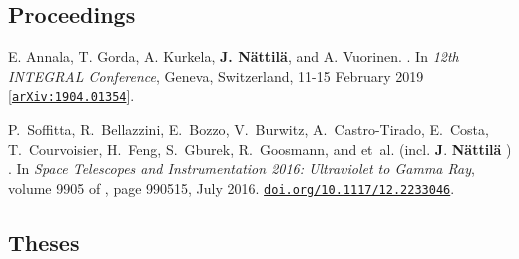 \documentclass[10pt]{article}
\begin{document}
\subsection*{\phantom{sub} Proceedings}
\vspace{-20pt}
\begin{thebibliography}{1}
\vspace{-5pt}

E. {Annala}, T. {Gorda}, A. {Kurkela}, \textbf{J. {N{\"a}ttil{\"a}}}, and A. {Vuorinen}.
.
\newblock In {\em 12th INTEGRAL Conference}, Geneva, Switzerland, 11-15 February 2019
[\href{https://arxiv.org/abs/1904.01354}{\nolinkurl{arXiv:1904.01354}}].

P.~{Soffitta}, R.~{Bellazzini}, E.~{Bozzo}, V.~{Burwitz}, A.~{Castro-Tirado},
  E.~{Costa}, T.~{Courvoisier}, H.~{Feng}, S.~{Gburek}, R.~{Goosmann}, and
  et~al. (incl. \textbf{J}. \textbf{{N{\"a}ttil{\"a}}} )
.
\newblock In {\em Space Telescopes and Instrumentation 2016: Ultraviolet to
  Gamma Ray}, volume 9905 of {\em \procspie}, page 990515, July 2016.
\href{https://doi.org/10.1117/12.2233046}{\nolinkurl{doi.org/10.1117/12.2233046}}.

\end{thebibliography}

\subsection*{\phantom{sub} Theses}
\end{document}
